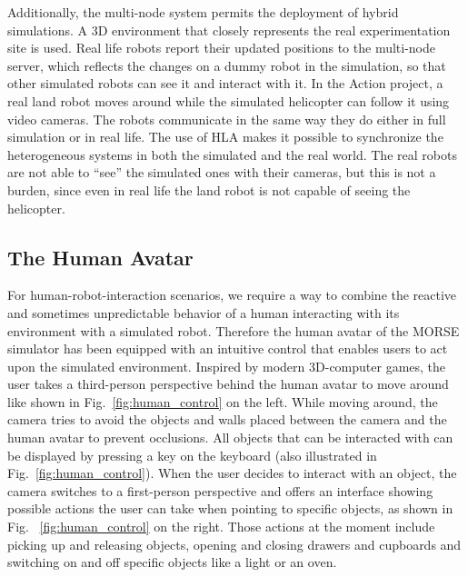 \documentclass{llncs}
\begin{document}
Additionally, the multi-node system permits the deployment of hybrid
simulations. A 3D environment that closely represents the real experimentation
site is used. Real life robots report their updated positions to the multi-node
server, which reflects the changes on a dummy robot 
in the simulation, so that other simulated robots can see it and interact with it.
In the Action project, a real land robot moves around while the simulated
helicopter can follow it using video cameras.
The robots communicate in the same way they do either in full simulation or in
real life. The use of HLA makes it possible to synchronize the heterogeneous
systems in both the simulated and the real world.
The real robots are not able to ``see'' the simulated ones with their
cameras, but this is not a burden, since even in real life the land
robot is not capable of seeing the helicopter.

\subsection{The Human Avatar}
\label{section:human}

For human-robot-interaction scenarios, we require a way to combine the
reactive and sometimes unpredictable behavior of a human interacting with its
environment with a simulated robot. Therefore the human avatar of the MORSE
simulator has been equipped with an intuitive control that enables users to act
upon the simulated environment. Inspired by modern 3D-computer games, the user
takes a third-person perspective behind the human avatar to move around like
shown in Fig.~\ref{fig:human_control} on the left.
While moving around, the camera tries to avoid the objects and walls placed
between the camera and the human avatar to prevent occlusions.  All objects
that can be interacted with can be displayed by pressing a key on the
keyboard (also illustrated in Fig.~\ref{fig:human_control}). When the user
decides to interact with an object, the camera switches to a first-person
perspective and offers an interface showing possible actions the
user can take when pointing to specific objects, as shown in Fig.~
\ref{fig:human_control} on the right. Those actions at the moment include
picking up and releasing objects, opening and closing drawers and cupboards and
switching on and off specific objects like a light or an oven.
\end{document}
